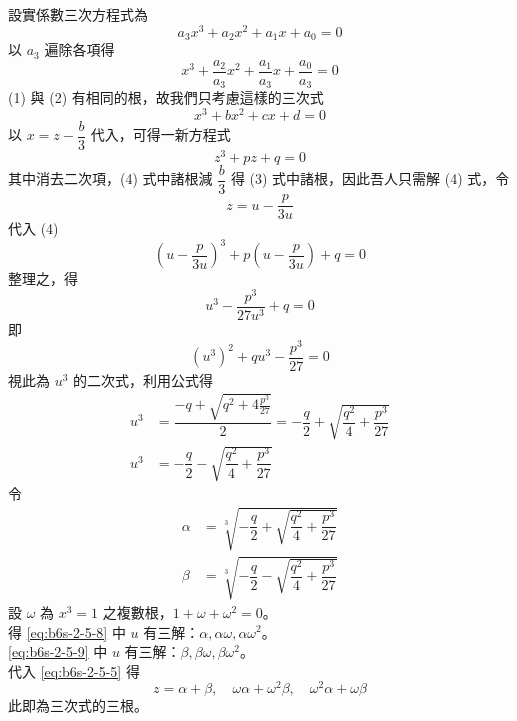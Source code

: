 設實係數三次方程式為
\begin{equation}
a_3 x^3 + a_2 x^2 + a_1 x + a_0 = 0 \label{eq:b6s-2-5-1}
\end{equation}
以 $a_3$ 遍除各項得
\begin{equation}
x^3 + \dfrac{a_2}{a_3}x^2 + \dfrac{a_1}{a_3}x + \dfrac{a_0}{a_3} = 0 \label{eq:b6s-2-5-2}
\end{equation}
(1) 與 (2) 有相同的根，故我們只考慮這樣的三次式
\begin{equation}
x^3 + bx^2 + cx + d = 0 \label{eq:b6s-2-5-3}
\end{equation}
以 $x = z - \dfrac{b}{3}$ 代入，可得一新方程式
\begin{equation}
z^3 + pz + q = 0 \label{eq:b6s-2-5-4}
\end{equation}
其中消去二次項，(4) 式中諸根減 $\dfrac{b}{3}$ 得 (3) 式中諸根，因此吾人只需解 (4) 式，令
\begin{equation}
z = u - \dfrac{p}{3u} \label{eq:b6s-2-5-5}
\end{equation}
代入 (4)
\[ \left( u - \dfrac{p}{3u} \right)^3 + p\left( u - \dfrac{p}{3u} \right) + q = 0 \]
整理之，得
\begin{equation}
u^3 - \dfrac{p^3}{27u^3} + q = 0 \label{eq:b6s-2-5-6}
\end{equation}
即
\begin{equation}
(u^3)^2 + qu^3 - \dfrac{p^3}{27} = 0 \label{eq:b6s-2-5-7}
\end{equation}
視此為 $u^3$ 的二次式，利用公式得
\begin{align}
u^3 &= \dfrac{-q + \sqrt{q^2 + 4\frac{p^3}{27}}}{2} = -\dfrac{q}{2} + \sqrt{\dfrac{q^2}{4} + \dfrac{p^3}{27}} \label{eq:b6s-2-5-8} \\
u^3 &= -\dfrac{q}{2} - \sqrt{\dfrac{q^2}{4} + \dfrac{p^3}{27}} \label{eq:b6s-2-5-9}
\end{align}
令
\begin{align*}
\alpha &= \sqrt[3]{-\dfrac{q}{2} + \sqrt{\dfrac{q^2}{4} + \dfrac{p^3}{27}}} \tag{I} \\
\beta &= \sqrt[3]{-\dfrac{q}{2} - \sqrt{\dfrac{q^2}{4} + \dfrac{p^3}{27}}} \tag{II}
\end{align*}
設 $\omega$ 為 $x^3=1$ 之複數根，$1+\omega+\omega^2=0$。\\
得 \eqref{eq:b6s-2-5-8} 中 $u$ 有三解：$\alpha, \alpha\omega, \alpha\omega^2$。\\
\eqref{eq:b6s-2-5-9} 中 $u$ 有三解：$\beta, \beta\omega, \beta\omega^2$。\\
代入 \eqref{eq:b6s-2-5-5} 得
\[ z = \alpha+\beta, \quad \omega\alpha+\omega^2\beta, \quad \omega^2\alpha+\omega\beta \]
此即為三次式的三根。

